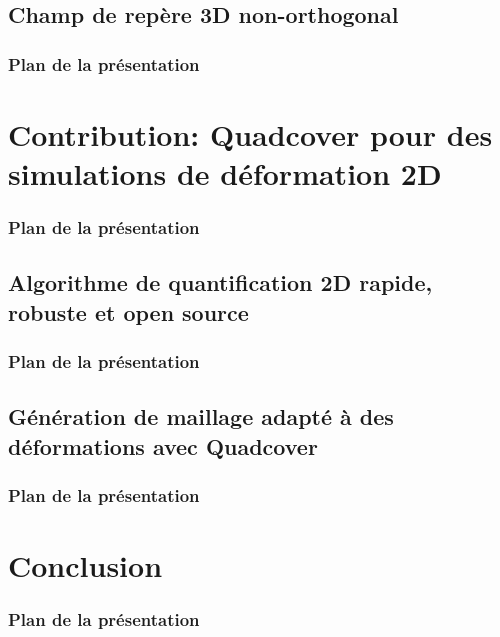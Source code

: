 \documentclass{beamer}
\begin{document}
\subsection{Champ de repère 3D non-orthogonal}
\begin{frame}
    \frametitle{Plan de la présentation}
    \tableofcontents[currentsubsection, sectionstyle=show/shaded, subsectionstyle=show/shaded/hide]
\end{frame}


%


%

\section{Contribution: Quadcover pour des simulations de déformation 2D}
\begin{frame}
    \frametitle{Plan de la présentation}
    \tableofcontents[currentsection, sectionstyle=show/shaded, subsectionstyle=show/show/hide]
\end{frame}
\subsection{Algorithme de quantification 2D rapide, robuste et open source}
\begin{frame}
    \frametitle{Plan de la présentation}
    \tableofcontents[currentsubsection, sectionstyle=show/shaded, subsectionstyle=show/shaded/hide]
\end{frame}

\subsection{Génération de maillage adapté à des déformations avec Quadcover}
\begin{frame}
    \frametitle{Plan de la présentation}
    \tableofcontents[currentsubsection, sectionstyle=show/shaded, subsectionstyle=show/shaded/hide]
\end{frame}


\section{Conclusion}
\begin{frame}
    \frametitle{Plan de la présentation}
    \tableofcontents[currentsection, sectionstyle=show/shaded, subsectionstyle=show/show/hide]
\end{frame}


\end{document}
